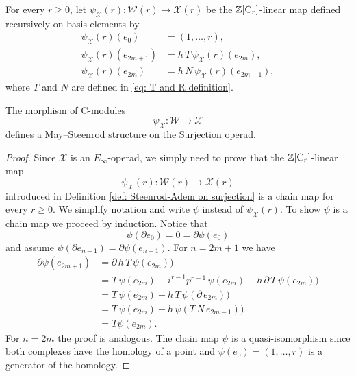 \begin{definition} \label{def: Steenrod-Adem on surjection}
	For every $r \geq 0$, let $\psi_{\mathcal X}(r) \colon \mathcal W(r) \to \mathcal X(r)$ be the $\mathbb{Z}[\mathrm{C}_r]$-linear map defined recursively on basis elements by
	\begin{align*}
	\psi_{\mathcal X}(r)(e_0) & = (1, \dots, r), \\
	\psi_{\mathcal X}(r)(e_{2m+1}) & = h\,T\,\psi_{\mathcal X}(r)(e_{2m}), \\
	\psi_{\mathcal X}(r)(e_{2m}) & = h\,N\,\psi_{\mathcal X}(r)(e_{2m-1}),
	\end{align*}
	where $T$ and $N$ are defined in \eqref{eq: T and R definition}.
\end{definition}

\begin{theorem} \label{thm: Steenrod-Adem on surjection MS convention}
	The morphism of $\mathrm{C}$-modules
	\begin{equation*}
	\psi_{\mathcal X} \colon \mathcal W \to \mathcal X
	\end{equation*}
	defines a May--Steenrod structure on the Surjection operad.
\end{theorem}

\begin{proof}
	Since $\mathcal X$ is an $E_\infty$-operad, we simply need to prove that the $\mathbb{Z}[\mathrm{C}_r]$-linear map
	\begin{equation*}
	\psi_{\mathcal X}(r) \colon \mathcal W(r) \to \mathcal X(r)
	\end{equation*}
	introduced in Definition \ref{def: Steenrod-Adem on surjection} is a chain map for every $r \geq 0$.
	We simplify notation and write $\psi$ instead of $\psi_{\mathcal X}(r)$.
	To show $\psi$ is a chain map we proceed by induction.
	Notice that
	\begin{equation*}
	\psi(\partial e_0) = 0 = \partial \psi(e_0)
	\end{equation*}
	and assume $\psi(\partial e_{n-1}) = \partial \psi(e_{n-1})$.
	For $n = 2m+1$ we have
	\begin{align*}
	\partial \psi(e_{2m+1}) 
	& =
	\partial\, h\, T\, \psi(e_{2m}) \big) \\
	& =
	T\, \psi(e_{2m}) - i^{r-1} p^{r-1}\, \psi(e_{2m}) -
	h\, \partial\, T\, \psi(e_{2m}) \big) \\
	& =
	T\, \psi(e_{2m}) - 
	h\, T\, \psi(\partial\, e_{2m}) \big) \\
	& =
	T\, \psi(e_{2m}) - 
	h\, \psi(T\,N\, e_{2m-1}) \big) \\
	& = 
	T \psi(e_{2m}).
	\end{align*}
	For $n = 2m$ the proof is analogous.
	The chain map $\psi$ is a quasi-isomorphism since both complexes have the homology of a point and $\psi(e_0) = (1, \dots, r)$ is a generator of the homology.
\end{proof}

